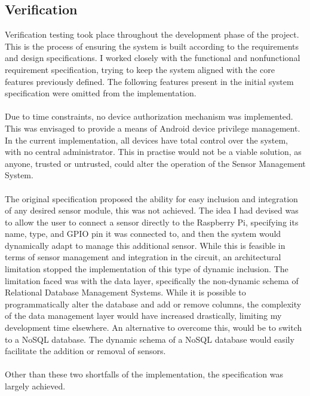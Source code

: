 \documentclass{article}
\begin{document}
\subsection{Verification}
Verification testing took place throughout the development phase of the project. This is the process of ensuring the system is built according to the requirements and design specifications. I worked closely with the functional and nonfunctional requirement specification, trying to keep the system aligned with the core features previously defined. The following features present in the initial system specification were omitted from the implementation. \\\\
Due to time constraints, no device authorization mechanism was implemented. This was envisaged to provide a means of Android device privilege management. In the current implementation, all devices have total control over the system, with no central administrator. This in practise would not be a viable solution, as anyone, trusted or untrusted, could alter the operation of the Sensor Management System. \\\\
The original specification proposed the ability for easy inclusion and integration of any desired sensor module, this was not achieved. The idea I had devised was to allow the user to connect a sensor directly to the Raspberry Pi, specifying its name, type, and GPIO pin it was connected to, and then the system would dynamically adapt to manage this additional sensor. While this is feasible in terms of sensor management and integration in the circuit, an architectural limitation stopped the implementation of this type of dynamic inclusion. The limitation faced was with the data layer, specifically the non-dynamic schema of Relational Database Management Systems. While it is possible to programmatically alter the database and add or remove columns, the complexity of the data management layer would have increased drastically, limiting my development time elsewhere. An alternative to overcome this, would be to switch to a NoSQL database. The dynamic schema of a NoSQL database would easily facilitate the addition or removal of sensors. \\\\
Other than these two shortfalls of the implementation, the specification was largely achieved. 
\end{document}
